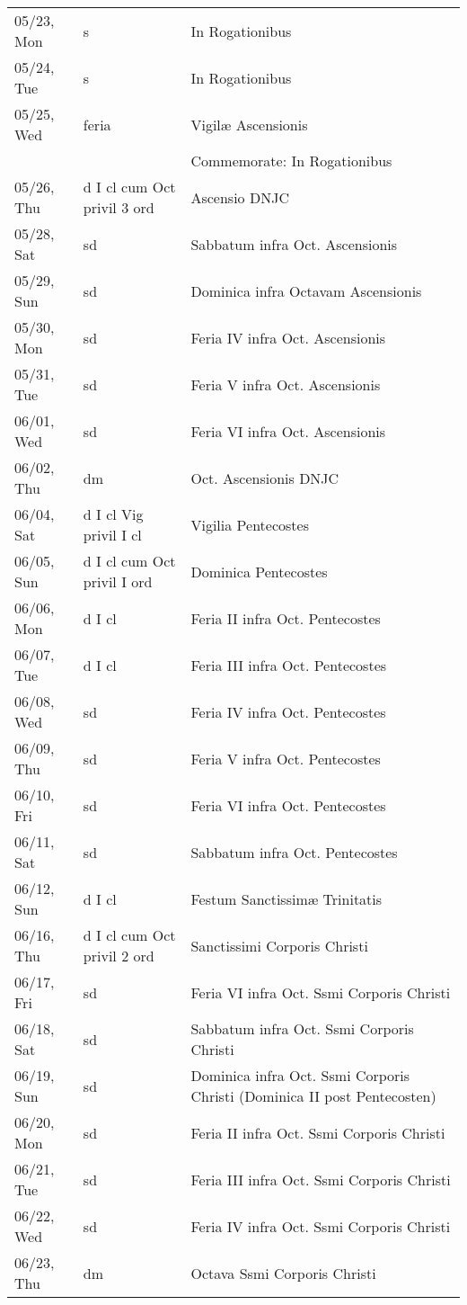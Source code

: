 \documentclass{article}
\begin{document}
\begin{longtable}{ l l l }
05/23, Mon & s & In Rogationibus\\
05/24, Tue & s & In Rogationibus\\
05/25, Wed & feria & Vigilæ Ascensionis\\
 & & Commemorate: In Rogationibus\\
05/26, Thu & d I cl cum Oct privil 3 ord & Ascensio DNJC\\
05/28, Sat & sd & Sabbatum infra Oct. Ascensionis\\
05/29, Sun & sd & Dominica infra Octavam Ascensionis\\
05/30, Mon & sd & Feria IV infra Oct. Ascensionis\\
05/31, Tue & sd & Feria V infra Oct. Ascensionis\\
06/01, Wed & sd & Feria VI infra Oct. Ascensionis\\
06/02, Thu & dm & Oct. Ascensionis DNJC\\
06/04, Sat & d I cl Vig privil I cl & Vigilia Pentecostes\\
06/05, Sun & d I cl cum Oct privil I ord & Dominica Pentecostes\\
06/06, Mon & d I cl & Feria II infra Oct. Pentecostes\\
06/07, Tue & d I cl & Feria III infra Oct. Pentecostes\\
06/08, Wed & sd & Feria IV infra Oct. Pentecostes\\
06/09, Thu & sd & Feria V infra Oct. Pentecostes\\
06/10, Fri & sd & Feria VI infra Oct. Pentecostes\\
06/11, Sat & sd & Sabbatum infra Oct. Pentecostes\\
06/12, Sun & d I cl & Festum Sanctissimæ Trinitatis\\
06/16, Thu & d I cl cum Oct privil 2 ord & Sanctissimi Corporis Christi\\
06/17, Fri & sd & Feria VI infra Oct. Ssmi Corporis Christi\\
06/18, Sat & sd & Sabbatum infra Oct. Ssmi Corporis Christi\\
06/19, Sun & sd & Dominica infra Oct. Ssmi Corporis Christi (Dominica II post Pentecosten)\\
06/20, Mon & sd & Feria II infra Oct. Ssmi Corporis Christi\\
06/21, Tue & sd & Feria III infra Oct. Ssmi Corporis Christi\\
06/22, Wed & sd & Feria IV infra Oct. Ssmi Corporis Christi\\
06/23, Thu & dm & Octava Ssmi Corporis Christi\\

\end{longtable}
\end{document}
